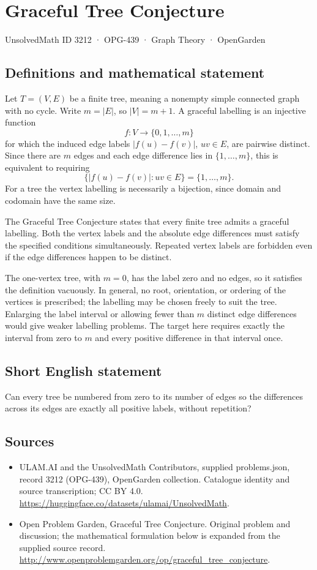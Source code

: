 \documentclass[11pt,a4paper]{article}
\begin{document}
\section*{Graceful Tree Conjecture}\label{3212}
{\small UnsolvedMath ID 3212 · OPG-439 · Graph Theory · OpenGarden}
\subsection{Definitions and mathematical statement}
Let $T=(V,E)$ be a finite tree, meaning
a nonempty simple connected graph with
no cycle. Write $m=|E|$, so $|V|=m+1$.
A graceful labelling is an injective
function
\[
 f:V\longrightarrow\{0,1,\ldots,m\}
\]
for which the induced edge labels
$|f(u)-f(v)|$, $uv\in E$, are pairwise
distinct. Since there are $m$ edges
and each edge difference lies in
$\{1,\ldots,m\}$, this is equivalent
to requiring
\[
 \{|f(u)-f(v)|:uv\in E\}=\{1,\ldots,m\}.
\]
For a tree the vertex labelling is
necessarily a bijection, since domain
and codomain have the same size.

The Graceful Tree Conjecture states
that every finite tree admits a
graceful labelling. Both the vertex
labels and the absolute edge differences
must satisfy the specified conditions
simultaneously. Repeated vertex labels
are forbidden even if the edge
differences happen to be distinct.

The one-vertex tree, with $m=0$,
has the label zero and no edges,
so it satisfies the definition
vacuously. In general, no root,
orientation, or ordering of the
vertices is prescribed; the labelling
may be chosen freely to suit the
tree. Enlarging the label interval
or allowing fewer than $m$ distinct
edge differences would give weaker
labelling problems. The target here
requires exactly the interval from
zero to $m$ and every positive
difference in that interval once.
\subsection{Short English statement}
Can every tree be numbered from zero to its number of edges so the differences across its edges are exactly all positive labels, without repetition?
\subsection{Sources}
\begin{itemize}
\item[S1] ULAM.AI and the UnsolvedMath Contributors, supplied problems.json, record 3212 (OPG-439), OpenGarden collection. Catalogue identity and source transcription; CC BY 4.0.
\url{https://huggingface.co/datasets/ulamai/UnsolvedMath}.
\item[S2] Open Problem Garden, Graceful Tree Conjecture. Original problem and discussion; the mathematical formulation below is expanded from the supplied source record.
\url{http://www.openproblemgarden.org/op/graceful_tree_conjecture}.
\end{itemize}
\end{document}
